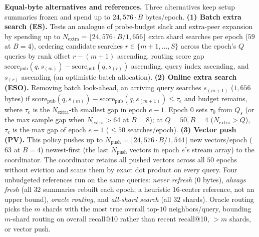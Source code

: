\textbf{Equal-byte alternatives and references.} Three alternatives keep setup summaries frozen and spend up to $24{,}576 \cdot B$ bytes/epoch. \textbf{(1) Batch extra search (ES).} Tests an analogue of probe-budget slack \cite{jose2026repartition} and extra-peer expansion \cite{semord2026} by spending up to $N_{\text{extra}} = \lfloor 24{,}576 \cdot B / 1{,}656 \rfloor$ extra shard searches per epoch ($59$ at $B = 4$), ordering candidate searches $r \in \{m+1, \dots, S\}$ across the epoch's $Q$ queries by rank offset $r - (m+1)$ ascending, routing score gap $\text{score}_{\text{pub}}(q, s_{(m)}) - \text{score}_{\text{pub}}(q, s_{(r)})$ ascending, query index ascending, and $s_{(r)}$ ascending (an optimistic batch allocation). \textbf{(2) Online extra search (ESO).} Removing batch look-ahead, an arriving query searches $s_{(m+1)}$ ($1{,}656$ bytes) if $\text{score}_{\text{pub}}(q, s_{(m)}) - \text{score}_{\text{pub}}(q, s_{(m+1)}) \le \tau_e$ and budget remains, where $\tau_e$ is the $N_{\text{extra}}$-th smallest gap in epoch $e-1$. Epoch $0$ sets $\tau_0$ from $Q_s$ (or the max sample gap when $N_{\text{extra}} > 64$ at $B{=}8$); at $Q{=}50, B{=}4$ ($N_{\text{extra}} > Q$), $\tau_e$ is the max gap of epoch $e{-}1$ ($\le 50$ searches/epoch). \textbf{(3) Vector push (PV).} This policy pushes up to $N_{\text{push}} = \lfloor 24{,}576 \cdot B / 1{,}544 \rfloor$ new vectors/epoch ($63$ at $B = 4$) newest-first (the last $N_{\text{push}}$ vectors in epoch $e$'s stream array) to the coordinator. The coordinator retains all pushed vectors across all $50$ epochs without eviction and scans them by exact dot product on every query. Four unbudgeted references run on the same queries: \emph{never refresh} ($0$ bytes), \emph{always fresh} (all $32$ summaries rebuilt each epoch; a heuristic $16$-center reference, not an upper bound), \emph{oracle routing}, and \emph{all-shard search} (all $32$ shards). Oracle routing picks the $m$ shards with the most true overall top-$10$ neighbors/query, bounding $m$-shard routing on overall recall@10 rather than recent recall@10, $>m$ shards, or vector push.

